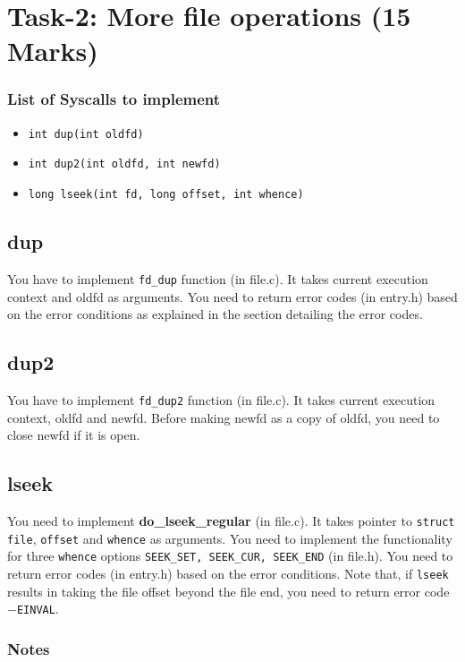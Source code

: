 \documentclass[12pt]{article}
\begin{document}
\section{Task-2: More file operations (15 Marks)}
\subsubsection*{List of Syscalls to implement}

\begin{itemize}
    \item {\tt int dup(int oldfd)}
    \item {\tt int dup2(int oldfd, int newfd)}
    \item {\tt long lseek(int fd, long offset, int whence)}
\end{itemize}


\subsection{dup}
You have to implement {\tt fd\_dup} function (in file.c). It takes current execution context and oldfd as arguments. 
You need to return error codes (in entry.h) based on the error conditions as explained in the section detailing the error 
codes.

\subsection{dup2}
You have to implement {\tt fd\_dup2} function (in file.c). 
It takes current execution context, oldfd and newfd. Before making newfd as a copy of oldfd, you need to close 
newfd if it is open.

\subsection{lseek}

You need to implement \textbf{do\_lseek\_regular} (in file.c). It takes pointer to {\tt struct file}, {\tt offset} and {\tt whence} as arguments. 
You need to implement the functionality for three {\tt whence} options {\tt SEEK\_SET, SEEK\_CUR, SEEK\_END} (in file.h). 
You need to return error codes (in entry.h) based on the error conditions. Note that, if {\tt lseek} results in taking the file offset
beyond the file end, you need to return error code $-${\tt EINVAL}.

\subsubsection*{Notes}
\end{document}
